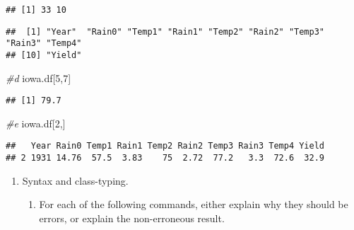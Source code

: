 \documentclass[
]{article}
\newenvironment{Shaded}{\begin{snugshade}}{\end{snugshade}}
\newcommand{\CommentTok}[1]{\textcolor[rgb]{0.56,0.35,0.01}{\textit{#1}}}
\newcommand{\DecValTok}[1]{\textcolor[rgb]{0.00,0.00,0.81}{#1}}
\newcommand{\KeywordTok}[1]{\textcolor[rgb]{0.13,0.29,0.53}{\textbf{#1}}}
\newcommand{\NormalTok}[1]{#1}
\providecommand{\tightlist}{%
  \setlength{\itemsep}{0pt}\setlength{\parskip}{0pt}}
\begin{document}
\begin{verbatim}
## [1] 33 10
\end{verbatim}

\begin{Shaded}
\end{Shaded}

\begin{verbatim}
##  [1] "Year"  "Rain0" "Temp1" "Rain1" "Temp2" "Rain2" "Temp3" "Rain3" "Temp4"
## [10] "Yield"
\end{verbatim}

\begin{Shaded}
\begin{Highlighting}[]
\CommentTok{#d}
\NormalTok{iowa.df[}\DecValTok{5}\NormalTok{,}\DecValTok{7}\NormalTok{]}
\end{Highlighting}
\end{Shaded}

\begin{verbatim}
## [1] 79.7
\end{verbatim}

\begin{Shaded}
\begin{Highlighting}[]
\CommentTok{#e}
\NormalTok{iowa.df[}\DecValTok{2}\NormalTok{,]}
\end{Highlighting}
\end{Shaded}

\begin{verbatim}
##   Year Rain0 Temp1 Rain1 Temp2 Rain2 Temp3 Rain3 Temp4 Yield
## 2 1931 14.76  57.5  3.83    75  2.72  77.2   3.3  72.6  32.9
\end{verbatim}

\begin{enumerate}
\def\labelenumi{\arabic{enumi}.}
\setcounter{enumi}{1}
\tightlist
\item
  Syntax and class-typing.

  \begin{enumerate}
  \def\labelenumii{\alph{enumii}.}
  \tightlist
  \item
    For each of the following commands, either explain why they should
    be errors, or explain the non-erroneous result.
  \end{enumerate}
\end{enumerate}
\end{document}
